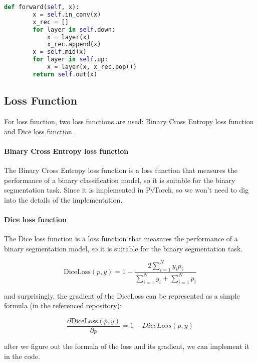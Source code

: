 \begin{lstlisting}[language=Python, caption=models/resnet34\_unet.py: ResNet34Unet, label=lst:resnet34_unet]
    def forward(self, x):
        x = self.in_conv(x)
        x_rec = []
        for layer in self.down:
            x = layer(x)
            x_rec.append(x)
        x = self.mid(x)
        for layer in self.up:
            x = layer(x, x_rec.pop())
        return self.out(x)
\end{lstlisting}

\subsection{Loss Function}
For loss function, two loss functions are used: Binary Cross Entropy loss function and Dice loss function.

\paragraph{Binary Cross Entropy loss function}
The Binary Cross Entropy loss function is a loss function that measures the performance of a binary classification model, so it is suitable for the binary segmentation task.
Since it is implemented in PyTorch, so we won't need to dig into the details of the implementation.

\paragraph{Dice loss function}
The Dice loss function is a loss function that measures the performance of a binary segmentation model, so it is suitable for the binary segmentation task.

\begin{equation}
    \label{eq:dice_loss}
    \text{DiceLoss}(p, y) = 1 - \frac{2 \sum_{i=1}^{N} y_i p_i}{\sum_{i=1}^{N} y_i + \sum_{i=1}^{N} p_i}
\end{equation}

and surprisingly, the gradient of the DiceLoss can be represented as a simple formula (in the referenced repository):

\begin{equation}
    \label{eq:dice_loss_gradient}
    \frac{\partial \text{DiceLoss}(p, y)}{\partial p} = 1 - DiceLoss(p, y)
\end{equation}

after we figure out the formula of the loss and its gradient, we can implement it in the code.

